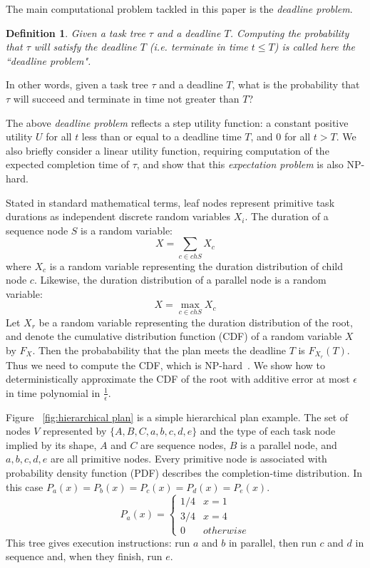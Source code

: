 \documentclass{article}
\newtheorem{definition}{Definition}
\begin{document}
The main computational problem tackled in this paper is the {\em deadline problem}. 
\begin{definition}\label{Def:Deadline}
	Given a task tree $\tau $ and a deadline $T$. 
	Computing the probability that $\tau $ will satisfy the deadline $T$ 
(i.e. terminate in time $t \leq T$) is called here the ``deadline problem".
\end{definition}
In other words, given a task tree $\tau $ and a deadline $T$, what is the probability that $\tau $ 
will succeed and terminate in time not greater than $T$? 

The above {\em deadline problem} reflects a step utility function: a 
constant positive utility $U$ for all $t$ less than or equal to a deadline 
time $T$, and $0$ for all $t>T$. We also briefly consider a linear utility function, requiring
computation of the expected completion time of $\tau$, and show that this {\em expectation problem} 
is also NP-hard.

Stated in standard mathematical terms, leaf nodes represent primitive task durations as
independent discrete random variables $X_i$. The duration of a sequence node $S$ is a random
variable:
\[
X = \sum_{c\in ch{S}} X_c
\]
where $X_c$ is a random variable representing the duration distribution of child node $c$.
Likewise, the duration distribution of a parallel node is a random variable:
\[
X = \max_{c\in ch{S}} X_c
\]
Let $X_r$ be a random variable representing the duration distribution of the root,
and denote the cumulative distribution function (CDF) of a random variable $X$ by $F_X$. Then
the probabability that the plan meets the deadline $T$ is $F_{X_r}(T)$.
Thus we need to compute the CDF, which is NP-hard~\cite{}. We show how
to deterministically approximate the CDF of the root with additive error at most $\epsilon $
in time polynomial in $\frac{1}{\epsilon}$.

Figure ~\ref{fig:hierarchical plan} is a simple hierarchical plan example. The set of nodes $ V$ represented by $\lbrace A,B,C,a,b,c,d,e \rbrace $ and the type of each task node implied by its shape, $A$ and $C$ are sequence nodes, $ B $ is a parallel node, and $ a, b, c, d, e $ are all primitive nodes. Every primitive node is associated with probability density function (PDF) describes the completion-time distribution. In this case $P_a(x)=P_b(x)=P_c(x)=P_d(x)=P_e(x)$.
$$P_a(x)=
\begin{cases}
1/4 & x=1 \\
3/4 & x=4 \\
0 & otherwise
\end{cases}$$
This tree gives execution instructions: run $a$ and $b$ in parallel, then run $c$ and $d$ in sequence and, when they finish, run $e$.
\end{document}

